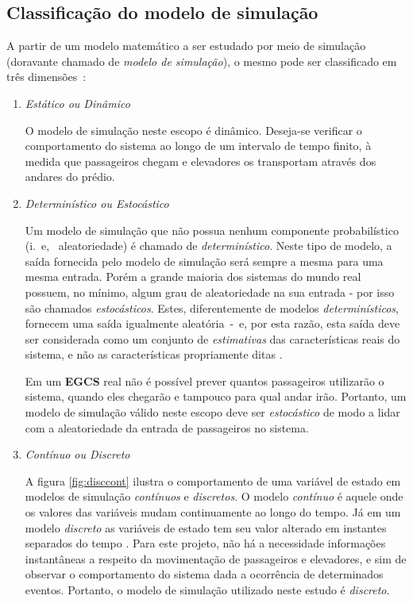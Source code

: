 \subsection{\label{simulator:motivation:classification}Classificação do modelo de simulação}

A partir de um modelo matemático a ser estudado por meio de simulação (doravante
chamado de \textit{modelo de simulação}), o mesmo pode ser classificado em três
dimensões~\cite{Banks,Law}:

\begin{enumerate}
\item \textit{Estático ou Dinâmico}

O modelo de simulação neste escopo é dinâmico. Deseja-se verificar o
comportamento do sistema ao longo de um intervalo de tempo finito, à medida que
passageiros chegam e elevadores os transportam através dos andares do prédio.

\item \textit{Determinístico ou Estocástico}

Um modelo de simulação que não possua nenhum componente probabilístico (i.~e,~
aleatoriedade) é chamado de \textit{determinístico}. Neste tipo de modelo, a
saída fornecida pelo modelo de simulação será sempre a mesma para uma mesma
entrada. Porém a grande maioria dos sistemas do mundo real possuem, no mínimo,
algum grau de aleatoriedade na sua entrada - por isso são chamados
\textit{estocásticos}. Estes, diferentemente de modelos
\textit{determinísticos}, fornecem uma saída igualmente aleatória~-~e, por esta
razão, esta saída deve ser considerada como um conjunto de \textit{estimativas}
das características reais do sistema, e não as características propriamente
ditas \cite{Banks}.

Em um \textbf{EGCS} real não é possível prever quantos passageiros utilizarão o
sistema, quando eles chegarão e tampouco para qual andar irão. Portanto, um
modelo de simulação válido neste escopo deve ser \textit{estocástico} de modo a
lidar com a aleatoriedade da entrada de passageiros no sistema.


\item \textit{Contínuo ou Discreto}

A figura \ref{fig:disccont} ilustra o comportamento de uma variável de estado em
modelos de simulação \textit{contínuos} e \textit{discretos}. O modelo
\textit{contínuo} é aquele onde os valores das variáveis mudam continuamente ao
longo do tempo. Já em um modelo \textit{discreto} as variáveis de estado tem seu
valor alterado em instantes separados do tempo \cite{Banks}. Para este projeto,
não há a necessidade informações instantâneas a respeito da movimentação de
passageiros e elevadores, e sim de observar o comportamento do sistema dada a
ocorrência de determinados eventos. Portanto, o modelo de simulação utilizado
neste estudo é \textit{discreto}.


\end{enumerate}
